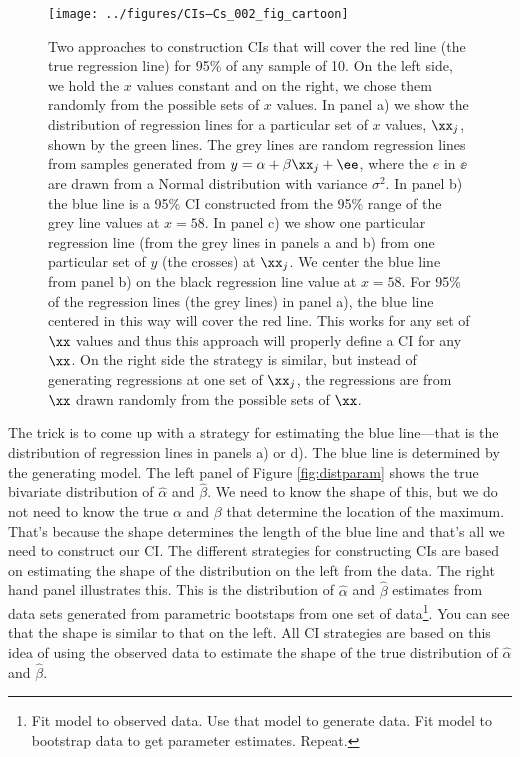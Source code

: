 \begin{figure}[htp]
\begin{center}
\texttt{[image: ../figures/CIs--Cs\_002\_fig\_cartoon]}
\end{center}
\caption{Two approaches to construction CIs that will cover the red line (the true regression line) for 95\% of any sample of 10.  On the left side, we hold the $x$ values constant and on the right, we chose them randomly from the possible sets of $x$ values.  In panel a) we show the distribution of regression lines for a particular set of $x$ values, $\xx_j$, shown by the green lines. The grey lines are random regression lines from samples generated from $y=\alpha + \beta \xx_j + \ee$, where the $e$ in $\ee$ are drawn from a Normal distribution with variance $\sigma^2$.  In panel b) the blue line is a 95\% CI constructed from the 95\% range of the grey line values at $x=58$. In panel c) we show one particular regression line (from the grey lines in panels a and b) from one particular set of $y$ (the crosses) at $\xx_j$.  We center the blue line from panel b) on the black regression line value at $x=58$.  For 95\% of the regression lines (the grey lines) in panel a), the blue line centered in this way will cover the red line.  This works for any set of $\xx$ values and thus this approach will properly define a CI for any $\xx$.  On the right side the strategy is similar, but instead of generating regressions at one set of $\xx_j$, the regressions are from $\xx$ drawn randomly from the possible sets of $\xx$.}
\label{fig:cartoon.cis}
\end{figure}

The trick is to come up with a strategy for estimating the blue line---that is the distribution of regression lines in panels a) or d).  The blue line is determined by the generating model. The left panel of Figure \ref{fig:distparam} shows the true bivariate distribution of $\hat{\alpha}$ and $\hat{\beta}$. We need to know the shape of this, but we do not need to know the true $\alpha$ and $\beta$ that determine the location of the maximum.  That's because the shape determines the length of the blue line and that's all we need to construct our CI.  The different strategies for constructing CIs are based on estimating the shape of the distribution on the left from the data.  The right hand panel illustrates this.  This is the distribution of $\hat{\alpha}$ and $\hat{\beta}$ estimates from data sets generated from parametric bootstaps from one set of data\footnote{Fit model to observed data. Use that model to generate data.  Fit model to bootstrap data to get parameter estimates. Repeat.}.  You can see that the shape is similar to that on the left. All CI strategies are based on this idea of using the observed data to estimate the shape of the true distribution of $\hat{\alpha}$ and $\hat{\beta}$.

